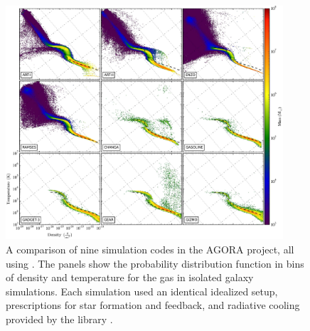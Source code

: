 \begin{figure}[h]
\begin{center}
\includegraphics[width=0.92\textwidth]{figures/fig17.eps}
\caption{A comparison of nine simulation codes in the AGORA project, all using
  \grackle{}.  The panels show the probability distribution function
  in bins of density and temperature for the gas in isolated galaxy
  simulations.  Each simulation used an identical idealized setup,
  prescriptions for star formation and feedback, and radiative cooling
  provided by the \grackle{} library
  \citep[from][]{2016ApJ...833..202K}.}
\label{fig:AGORA}
\end{center}
\vspace*{-2\baselineskip}
\end{figure}


